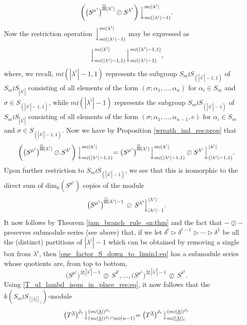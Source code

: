 \documentclass[ALCO,Unicode,published]{cedram}
\newcommand{\ul}[1]{\underline{#1}}
\begin{document}
\[\left(\bigl(S^{\mu^i}\bigr)^{\widetilde\boxtimes |\lambda^i|}\oslash S^{\lambda^i}\right)\Bigl\downarrow^{m \wr |\lambda^i|}_{m \wr (|\lambda^i|-1)}.\]
Now the restriction operation $\Bigl\downarrow^{m \wr |\lambda^i|}_{m \wr (|\lambda^i|-1)}$ may be expressed as
\[\Bigl\downarrow^{m \wr |\lambda^i|}_{m \wr (|\lambda^i|-1,1)}\Bigl\downarrow^{m \wr (|\lambda^i|-1,1)}_{m \wr (|\lambda^i|-1)},\]
where, we recall, $m \wr (|\lambda^i|-1,1)$ represents the subgroup $S_m \wr S_{(|\lambda^i|-1,1)}$ of $S_m \wr S_{|\lambda^i|}$ consisting of all
elements of the form $(\sigma;\alpha_1,\ldots,\alpha_n)$ for $\alpha_i \in S_m$ and $\sigma \in S_{(|\lambda^i|-1,1)}$, while
$m \wr (|\lambda^i|-1)$ represents the subgroup $S_m \wr S_{(|\lambda^i|-1)}$ of $S_m \wr S_{|\lambda^i|}$ consisting of all elements of the form
$(\sigma;\alpha_1,\ldots,\alpha_{n-1},e)$ for $\alpha_i \in S_m$ and $\sigma \in S_{(|\lambda^i|-1,1)}$. Now we have by
Proposition \ref{wreath_ind_res:prop} that
\[
\left(\bigl(S^{\mu^i}\bigr)^{\widetilde\boxtimes |\lambda^i|}\oslash S^{\lambda^i}\right)\Bigl\downarrow^{m \wr |\lambda^i|}_{m \wr (|\lambda^i|-1,1)}
=
\bigl(S^{\mu^i}\bigr)^{\widetilde\boxtimes |\lambda^i|}\Bigl\downarrow^{m \wr |\lambda^i|}_{m \wr (|\lambda^i|-1,1)}\:\oslash\:
S^{\lambda^i}\Bigl\downarrow^{|\lambda^i|}_{(|\lambda^i|-1,1)}.
\]
Upon further restriction to $S_m \wr S_{(|\lambda^i|-1)}$, we see that this is isomorphic to the direct sum of $\mathrm{dim}_k(S^{\mu^i})$
copies of the module
\begin{equation}\label{one_factor_S_down_to_limin1:eq}
\bigl(S^{\mu^i}\bigr)^{\widetilde\boxtimes |\lambda^i|-1}\,\oslash\,S^{\lambda^i}\!\Bigl\downarrow^{|\lambda^i|}_{|\lambda^i|-1}.
\end{equation}
It now follows by Theorem \ref{jam_branch_rule_sn:thm} and the fact that $- \oslash -$ preserves submodule series (see above)
that, if we let $\delta^{t} \triangleright \delta^{t-1} \triangleright \cdots \triangleright \delta^{1}$ be all the (distinct) partitions
of $|\lambda^i|-1$ which can be obtained by removing a single box from $\lambda^i$, then \eqref{one_factor_S_down_to_limin1:eq} has a
submodule series whose quotients are, from top to bottom,
\[
\bigl(S^{\mu^i}\bigr)^{\widetilde\boxtimes |\lambda^i|-1}\,\oslash\,S^{\delta^{t}},\ldots,
\bigl(S^{\mu^i}\bigr)^{\widetilde\boxtimes |\lambda^i|-1}\,\oslash\,S^{\delta^{1}}.
\]
Using \eqref{T_ul_lambd_isom_in_place_res:eq}, it now follows that the $k(S_m \wr S_{[|\ul{\lambda}|]_i})$-module
\[\bigl(T^{\ul{\lambda}}\bigr)^{\hat\rho_i}\bigl\downarrow^{(m{\wr}|\ul{\lambda}|)^{\hat\rho_i}}_{(m{\wr}|\ul{\lambda}|)^{\hat\rho_i} \cap m \wr (n-1)}
=
\bigl(T^{\ul{\lambda}}\bigr)^{\hat\rho_i}\bigl\downarrow^{(m{\wr}|\ul{\lambda}|)^{\hat\rho_i}}_{m \wr [|\ul{\lambda}|]_i}\]
\end{document}
